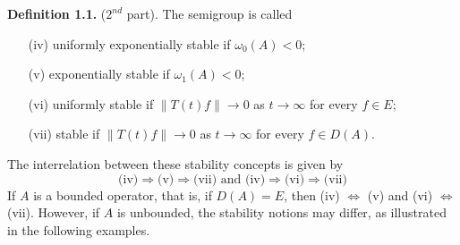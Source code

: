 \bigskip
\noindent
{\bf Definition 1.1.} ($2^{nd}$ part). 
The semigroup is called
\begin{enumerate}
\item[(iv)] uniformly exponentially stable if $\omega_0(A) < 0$;
\item[(v)] exponentially stable if $\omega_{1}(A) < 0$;
\item[(vi)] uniformly stable if $\|T(t)f\| \to 0$ as $t \to \infty$ for every $f \in E$;
\item[(vii)] stable if $\|T(t)f\| \to 0$ as $t \to \infty$ for every $f \in D(A)$.
\end{enumerate}
\bigskip
\noindent
The interrelation between these stability concepts is given by
\[
\text{(iv)} \Rightarrow \text{(v)} \Rightarrow \text{(vii)} \text{ and } \text{(iv)} \Rightarrow \text{(vi)} \Rightarrow \text{(vii)}
\]
If $A$ is a bounded operator, that is, if $D(A) = E$, then (iv) $\Leftrightarrow$ (v) and (vi) $\Leftrightarrow$ (vii).
However, if $A$ is unbounded, the stability notions may differ, as illustrated in the following examples.
